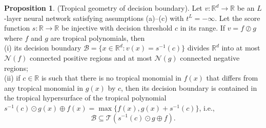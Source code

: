 \documentclass{article}
\theoremstyle{definition}
\newtheorem{proposition}[theorem]{Proposition}
\begin{document}
\begin{proposition}\hspace{1sp}\cite{zhang2018tropical}(Tropical geometry of decision boundary).
\label{prop:geom_of_dec_boundary}
Let $v : \mathbb{R}^{d} \to \mathbb{R}$ be an $L$-layer neural network satisfying assumptions (a)–(c) with $t^{L}=-\infty$. Let the score function $s: \mathbb{R} \to \mathbb{R}$ be injective with decision threshold $c$ in its range. If $v = f \oslash g$ where $f$ and $g$ are tropical polynomials, then \\
(i) its decision boundary $\mathcal{B}=\{ x \in \mathbb{R}^{d} : v(x) = s^{-1}(c)\}$ divides $\mathbb{R}^{d}$ into at most $\mathcal{N} (f)$ connected positive regions and at most $\mathcal{N}(g)$ connected negative regions; \\
(ii) if $c \in \mathbb{R}$ is such that there is no tropical monomial in $f(x)$ that differs from any tropical monomial in $g(x)$ by $c$, then its decision boundary is contained in the tropical hypersurface of the tropical polynomial $s^{-1}(c) \odot g(x) \oplus f(x) = \max\{f(x), g(x) + s^{-1}(c)\}$, i.e.,
$$\mathcal{B} \subseteq \mathcal{T} (s^{-1}(c) \odot g \oplus f).$$
\end{proposition}
\end{document}

